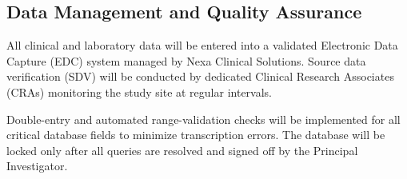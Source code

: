 \subsection{Data Management and Quality Assurance}

All clinical and laboratory data will be entered into a validated Electronic Data Capture (EDC) system managed by Nexa Clinical Solutions. Source data verification (SDV) will be conducted by dedicated Clinical Research Associates (CRAs) monitoring the study site at regular intervals. 

Double-entry and automated range-validation checks will be implemented for all critical database fields to minimize transcription errors. The database will be locked only after all queries are resolved and signed off by the Principal Investigator.
